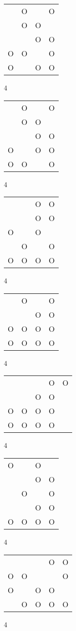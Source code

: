 \begin{tabular}{|m{0.2cm}m{0.2cm}m{0.2cm}m{0.2cm}|}\hline
 &O& &O\\
 &O&O& \\
 & &O&O\\
O&O& &O\\
O& &O&O\\
\hline\end{tabular}4
\begin{tabular}{|m{0.2cm}m{0.2cm}m{0.2cm}m{0.2cm}|}\hline
 &O& &O\\
 &O&O& \\
 & &O&O\\
O& &O&O\\
O&O& &O\\
\hline\end{tabular}4
\begin{tabular}{|m{0.2cm}m{0.2cm}m{0.2cm}m{0.2cm}|}\hline
 & &O&O\\
 & &O&O\\
O& &O& \\
 &O& &O\\
O&O&O&O\\
\hline\end{tabular}4
\begin{tabular}{|m{0.2cm}m{0.2cm}m{0.2cm}m{0.2cm}|}\hline
 &O& &O\\
 & &O&O\\
O&O&O&O\\
O&O&O&O\\
\hline\end{tabular}4
\begin{tabular}{|m{0.2cm}m{0.2cm}m{0.2cm}m{0.2cm}m{0.2cm}|}\hline
 & & &O&O\\
 & &O&O& \\
O&O&O&O& \\
O&O&O&O& \\
\hline\end{tabular}4
\begin{tabular}{|m{0.2cm}m{0.2cm}m{0.2cm}m{0.2cm}|}\hline
O& &O& \\
 & &O&O\\
 &O& &O\\
 & &O&O\\
O&O&O&O\\
\hline\end{tabular}4
\begin{tabular}{|m{0.2cm}m{0.2cm}m{0.2cm}m{0.2cm}m{0.2cm}|}\hline
 & & &O&O\\
O&O& & &O\\
O& &O&O& \\
 &O&O&O&O\\
\hline\end{tabular}4
